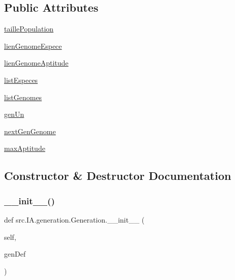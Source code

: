 \subsection*{Public Attributes}
\begin{DoxyCompactItemize}
\item 
\hyperlink{classsrc_1_1_i_a_1_1generation_1_1_generation_a289b8af8c8cf5a43f6938ac3da049be6}{taille\+Population}
\item 
\hyperlink{classsrc_1_1_i_a_1_1generation_1_1_generation_a5823d34110f87559ab5dc4a98afe7998}{lien\+Genome\+Espece}
\item 
\hyperlink{classsrc_1_1_i_a_1_1generation_1_1_generation_acebe71008688e50ea888f0c04e9e48df}{lien\+Genome\+Aptitude}
\item 
\hyperlink{classsrc_1_1_i_a_1_1generation_1_1_generation_aad01f3386b8cbb8330b35cd19b309fd2}{list\+Especes}
\item 
\hyperlink{classsrc_1_1_i_a_1_1generation_1_1_generation_ae98a08f378f6fbf32f19c0040b939edf}{list\+Genomes}
\item 
\hyperlink{classsrc_1_1_i_a_1_1generation_1_1_generation_af59322c5589f1adb51092b9af862c97f}{gen\+Un}
\item 
\hyperlink{classsrc_1_1_i_a_1_1generation_1_1_generation_abbb9024da18de7bf0ad95386ead3c317}{next\+Gen\+Genome}
\item 
\hyperlink{classsrc_1_1_i_a_1_1generation_1_1_generation_ac2ec6362a7cffed8c05bf5fb8b3b28b6}{max\+Aptitude}
\end{DoxyCompactItemize}


\subsection{Constructor \& Destructor Documentation}
\mbox{\label{classsrc_1_1_i_a_1_1generation_1_1_generation_af1a9b4e0d54cf2d95b643ee32f0a7785}} 
\subsubsection{\texorpdfstring{\+\_\+\+\_\+init\+\_\+\+\_\+()}{\_\_init\_\_()}}
{\footnotesize\ttfamily def src.\+I\+A.\+generation.\+Generation.\+\_\+\+\_\+init\+\_\+\+\_\+ (\begin{DoxyParamCaption}\item[{}]{self,  }\item[{}]{gen\+Def }\end{DoxyParamCaption})}



